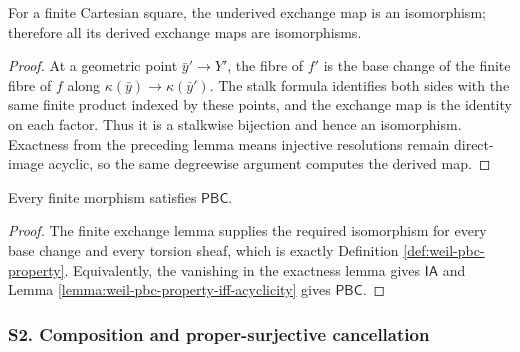 \begin{lemma}
\label{lemma:weil-pbc-finite-exchange}
\leanok
For a finite Cartesian square, the underived exchange map is an isomorphism;
therefore all its derived exchange maps are isomorphisms.
\end{lemma}
\begin{proof}
\leanok

At a geometric point $\bar y'\to Y'$, the fibre of $f'$ is the base change of
the finite fibre of $f$ along $\kappa(\bar y)\to\kappa(\bar y')$.  The stalk
formula identifies both sides with the same finite product indexed by these
points, and the exchange map is the identity on each factor.  Thus it is a
stalkwise bijection and hence an isomorphism.  Exactness from the preceding
lemma means injective resolutions remain direct-image acyclic, so the same
degreewise argument computes the derived map.
\end{proof}

\begin{proposition}
\label{prop:weil-pbc-finite-morphism}
\leanok

Every finite morphism satisfies $\mathsf{PBC}$.
\end{proposition}
\begin{proof}
\leanok

The finite exchange lemma supplies the required isomorphism for every base
change and every torsion sheaf, which is exactly Definition
\ref{def:weil-pbc-property}.  Equivalently, the vanishing in the exactness
lemma gives $\mathsf{IA}$ and Lemma \ref{lemma:weil-pbc-property-iff-acyclicity}
gives $\mathsf{PBC}$.
\end{proof}

\subsubsection{S2. Composition and proper-surjective cancellation}

